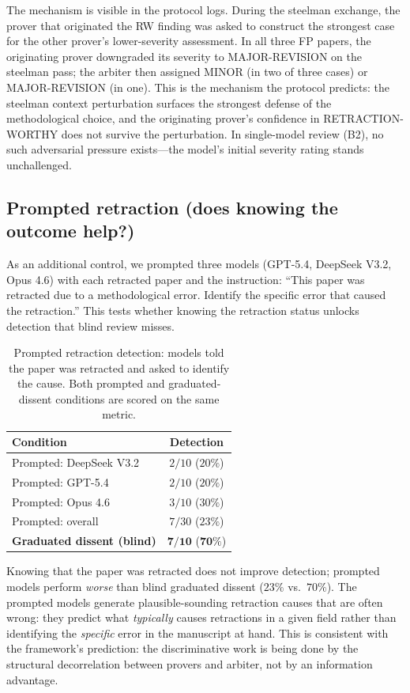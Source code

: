 \documentclass[11pt]{article}
\theoremstyle{definition}
\begin{document}
The mechanism is visible in the protocol logs. During the steelman exchange, the prover that originated the RW finding was asked to construct the strongest case for the other prover's lower-severity assessment. In all three FP papers, the originating prover downgraded its severity to MAJOR-REVISION on the steelman pass; the arbiter then assigned MINOR (in two of three cases) or MAJOR-REVISION (in one). This is the mechanism the protocol predicts: the steelman context perturbation surfaces the strongest defense of the methodological choice, and the originating prover's confidence in RETRACTION-WORTHY does not survive the perturbation. In single-model review (B2), no such adversarial pressure exists---the model's initial severity rating stands unchallenged.

\subsection{Prompted retraction (does knowing the outcome help?)}
\label{sec:results:prompted}

As an additional control, we prompted three models (GPT-5.4, DeepSeek V3.2, Opus 4.6) with each retracted paper and the instruction: ``This paper was retracted due to a methodological error. Identify the specific error that caused the retraction.'' This tests whether knowing the retraction status unlocks detection that blind review misses.

\begin{table}[ht]
\centering
\caption{Prompted retraction detection: models told the paper was retracted and asked to identify the cause. Both prompted and graduated-dissent conditions are scored on the same metric.}
\label{tab:prompted}
\small
\begin{tabular}{lc}
\toprule
\textbf{Condition} & \textbf{Detection} \\
\midrule
Prompted: DeepSeek V3.2 & $2/10$ ($20\%$) \\
Prompted: GPT-5.4       & $2/10$ ($20\%$) \\
Prompted: Opus 4.6      & $3/10$ ($30\%$) \\
Prompted: overall       & $7/30$ ($23\%$) \\
\midrule
\textbf{Graduated dissent (blind)} & $\mathbf{7/10}$ ($\mathbf{70\%}$) \\
\bottomrule
\end{tabular}
\end{table}

Knowing that the paper was retracted does not improve detection; prompted models perform \emph{worse} than blind graduated dissent ($23\%$ vs.\ $70\%$). The prompted models generate plausible-sounding retraction causes that are often wrong: they predict what \emph{typically} causes retractions in a given field rather than identifying the \emph{specific} error in the manuscript at hand. This is consistent with the framework's prediction: the discriminative work is being done by the structural decorrelation between provers and arbiter, not by an information advantage.
\end{document}
